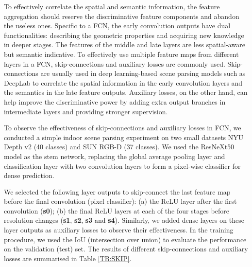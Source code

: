 \documentclass[10pt,twocolumn,twoside]{IEEEtran}
\begin{document}
To effectively correlate the spatial and semantic information, the feature aggregation should reserve the discriminative feature components and abandon the useless ones. Specific to a FCN, the early convolution outputs have dual functionalities: describing the geometric properties and acquiring new knowledge in deeper stages. The features of the middle and late layers are less spatial-aware but semantic indicative. To effectively use multiple feature maps from different layers in a FCN, skip-connections and auxiliary losses are commonly used. Skip-connections are usually used in deep learning-based scene parsing models such as DeepLab \cite{TPAMI:DEEPLAB} to correlate the spatial information in the early convolution layers and the semantics in the late feature outputs. Auxiliary losses, on the other hand, can help improve the discriminative power by adding extra output branches in intermediate layers and providing stronger supervision.

To observe the effectiveness of skip-connections and auxiliary losses in FCN, we conducted a simple indoor scene parsing experiment on two small datasets NYU Depth v2 \cite{ECCV12:NYU} (40 classes) and SUN RGB-D \cite{NIPS14:SUN} (37 classes). We used the ResNeXt50 model \cite{CVPR17:RESNEXT} as the stem network, replacing the global average pooling layer and classification layer with two convolution layers to form a pixel-wise classifier for dense prediction.

We selected the following layer outputs to skip-connect the last feature map before the final convolution (pixel classifier): (a) the ReLU layer after the first convolution ({\bf s0}); (b) the final ReLU layers at each of the four stages before resolution changes ({\bf s1}, {\bf s2}, {\bf s3} and {\bf s4}). Similarly, we added dense layers on these layer outputs as auxiliary losses to observe their effectiveness. In the training procedure, we used the IoU (intersection over union) to evaluate the performance on the validation (test) set. The results of different skip-connections and auxiliary losses are summarised in Table \ref{TB:SKIP}.
\end{document}
